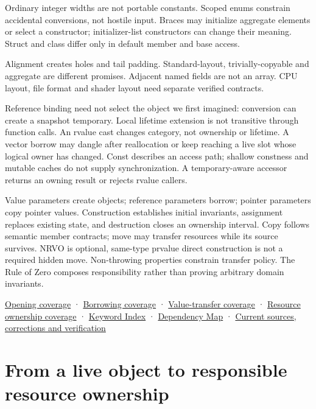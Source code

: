 Ordinary integer widths are not portable constants. Scoped enums constrain accidental conversions, not hostile input. Braces may initialize aggregate elements or select a constructor; initializer-list constructors can change their meaning. Struct and class differ only in default member and base access.

Alignment creates holes and tail padding. Standard-layout, trivially-copyable and aggregate are different promises. Adjacent named fields are not an array. CPU layout, file format and shader layout need separate verified contracts.

Reference binding need not select the object we first imagined: conversion can create a snapshot temporary. Local lifetime extension is not transitive through function calls. An rvalue cast changes category, not ownership or lifetime. A vector borrow may dangle after reallocation or keep reaching a live slot whose logical owner has changed. Const describes an access path; shallow constness and mutable caches do not supply synchronization. A temporary-aware accessor returns an owning result or rejects rvalue callers.

Value parameters create objects; reference parameters borrow; pointer parameters copy pointer values. Construction establishes initial invariants, assignment replaces existing state, and destruction closes an ownership interval. Copy follows semantic member contracts; move may transfer resources while its source survives. NRVO is optional, same-type prvalue direct construction is not a required hidden move. Non-throwing properties constrain transfer policy. The Rule of Zero composes responsibility rather than proving arbitrary domain invariants.

\hyperref[appendix-fd090d982a15-m007---parts-101-112]{Opening coverage} · \hyperref[appendix-fd090d982a15-m008---parts-113-126]{Borrowing coverage} · \hyperref[appendix-fd090d982a15-m009---parts-127-147]{Value-transfer coverage} · \hyperref[appendix-fd090d982a15-m010---parts-148-160]{Resource ownership coverage} · \hyperref[appendix-a6d556a4ef50]{Keyword Index} · \hyperref[appendix-4ad47bdd269a]{Dependency Map} · \hyperref[appendix-a103e7846d21-m010---resource-ownership]{Current sources, corrections and verification}

\section{From a live object to responsible resource ownership}\label{05-engine-i-ch004-from-a-live-object-to-responsible-resource-ownership}

